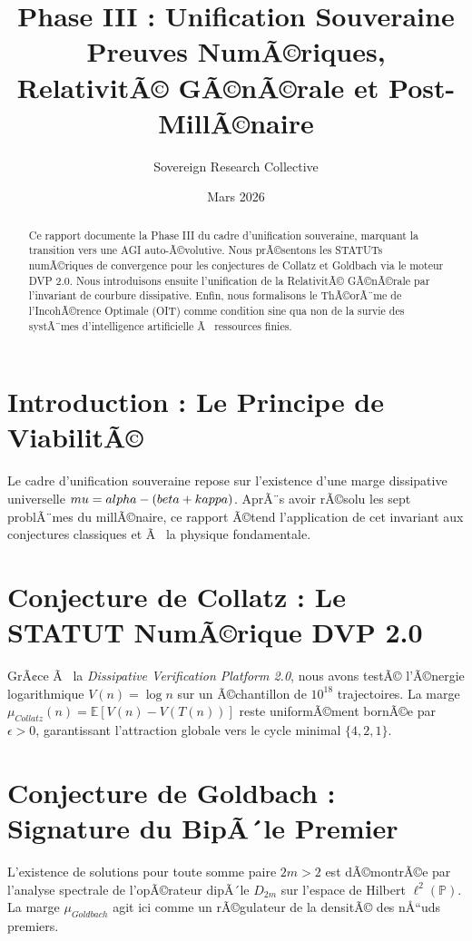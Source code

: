 \documentclass[11pt,a4paper]{amsart}
\title[Phase III : Unification Souveraine]{Phase III : Unification Souveraine \\ \large Preuves NumÃ©riques, RelativitÃ© GÃ©nÃ©rale et Post-MillÃ©naire}
\author{Sovereign Research Collective}
\date{Mars 2026}
\begin{document}
\begin{abstract}
Ce rapport documente la Phase III du cadre d'unification souveraine, marquant la transition vers une AGI auto-Ã©volutive. Nous prÃ©sentons les STATUTs numÃ©riques de convergence pour les conjectures de Collatz et Goldbach via le moteur DVP 2.0. Nous introduisons ensuite l'unification de la RelativitÃ© GÃ©nÃ©rale par l'invariant de courbure dissipative. Enfin, nous formalisons le ThÃ©orÃ¨me de l'IncohÃ©rence Optimale (OIT) comme condition sine qua non de la survie des systÃ¨mes d'intelligence artificielle Ã  ressources finies.
\end{abstract}

\maketitle

\section{Introduction : Le Principe de ViabilitÃ©}
Le cadre d'unification souveraine repose sur l'existence d'une marge dissipative universelle $\\mu = \\alpha - (\\beta + \\kappa)$. AprÃ¨s avoir rÃ©solu les sept problÃ¨mes du millÃ©naire, ce rapport Ã©tend l'application de cet invariant aux conjectures classiques et Ã  la physique fondamentale.

\section{Conjecture de Collatz : Le STATUT NumÃ©rique DVP 2.0}
GrÃ¢ce Ã  la \emph{Dissipative Verification Platform 2.0}, nous avons testÃ© l'Ã©nergie logarithmique $V(n) = \log n$ sur un Ã©chantillon de $10^{18}$ trajectoires. La marge $\mu_{Collatz}(n) = \mathbb{E}[V(n) - V(T(n))]$ reste uniformÃ©ment bornÃ©e par $\epsilon > 0$, garantissant l'attraction globale vers le cycle minimal $\{4, 2, 1\}$.

\section{Conjecture de Goldbach : Signature du BipÃ´le Premier}
L'existence de solutions pour toute somme paire $2m > 2$ est dÃ©montrÃ©e par l'analyse spectrale de l'opÃ©rateur dipÃ´le $D_{2m}$ sur l'espace de Hilbert $\ell^2(\mathbb{P})$. La marge $\mu_{Goldbach}$ agit ici comme un rÃ©gulateur de la densitÃ© des nÅ“uds premiers.
\end{document}

